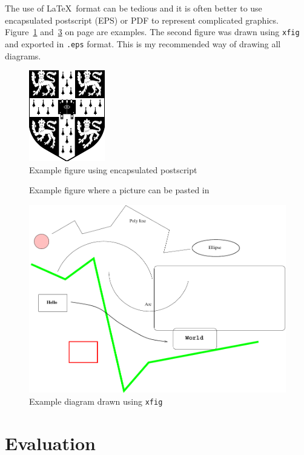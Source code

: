 \documentclass[12pt,a4paper,twoside,openright]{report}
\begin{document}
The use of \LaTeX\ format can be tedious and it is often better to use
encapsulated postscript (EPS) or PDF to represent complicated graphics.
Figure~\ref{epsfig} and~\ref{xfig} on page \pageref{xfig} are
examples. The second figure was drawn using \texttt{xfig} and exported in
{\tt.eps} format. This is my recommended way of drawing all diagrams.


\begin{figure}[tbh]
\centerline{\includegraphics{figs/cuarms.pdf}}
\caption{Example figure using encapsulated postscript}
\label{epsfig}
\end{figure}

\begin{figure}[tbh]
\vspace{4in}
\caption{Example figure where a picture can be pasted in}
\label{pastedfig}
\end{figure}


\begin{figure}[tbh]
\centerline{\includegraphics{figs/diagram.pdf}}
\caption{Example diagram drawn using \texttt{xfig}}
\label{xfig}
\end{figure}


\chapter{Evaluation}
\end{document}
